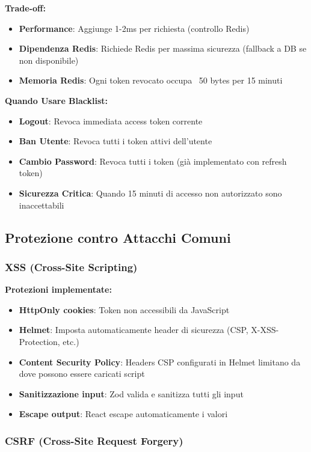 \documentclass[11pt,a4paper]{article}
\begin{document}
\textbf{Trade-off:}
\begin{itemize}
    \item \textbf{Performance}: Aggiunge 1-2ms per richiesta (controllo Redis)
    \item \textbf{Dipendenza Redis}: Richiede Redis per massima sicurezza (fallback a DB se non disponibile)
    \item \textbf{Memoria Redis}: Ogni token revocato occupa ~50 bytes per 15 minuti
\end{itemize}

\textbf{Quando Usare Blacklist:}
\begin{itemize}
    \item \textbf{Logout}: Revoca immediata access token corrente
    \item \textbf{Ban Utente}: Revoca tutti i token attivi dell'utente
    \item \textbf{Cambio Password}: Revoca tutti i token (già implementato con refresh token)
    \item \textbf{Sicurezza Critica}: Quando 15 minuti di accesso non autorizzato sono inaccettabili
\end{itemize}

\subsection{Protezione contro Attacchi Comuni}

\subsubsection{XSS (Cross-Site Scripting)}

\textbf{Protezioni implementate:}
\begin{itemize}
    \item \textbf{HttpOnly cookies}: Token non accessibili da JavaScript
    \item \textbf{Helmet}: Imposta automaticamente header di sicurezza (CSP, X-XSS-Protection, etc.)
    \item \textbf{Content Security Policy}: Headers CSP configurati in Helmet limitano da dove possono essere caricati script
    \item \textbf{Sanitizzazione input}: Zod valida e sanitizza tutti gli input
    \item \textbf{Escape output}: React escape automaticamente i valori
\end{itemize}

\subsubsection{CSRF (Cross-Site Request Forgery)}
\end{document}
